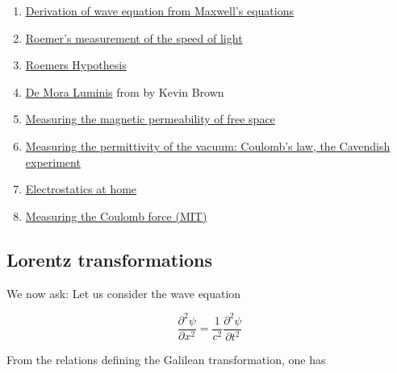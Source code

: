 \begin{enumerate}

\item \href{http://www.santarosa.edu/~lwillia2/42/WaveEquationDerivation.pdf}{Derivation of wave equation from Maxwell's equations}

\item \href{http://www.amnh.org/education/resources/rfl/web/essaybooks/cosmic/p_roemer.html}{Roemer's measurement of the speed of light}

\item \href{http://www.mathpages.com/home/kmath203/kmath203.htm}{Roemers  Hypothesis}

\item \href{http://www.mathpages.com/rr/s3-03/3-03.htm}{De Mora Luminis} from  by Kevin Brown

\item \href{http://physics.wooster.edu/JrIS/Files/Moore_Web_article.pdf}{Measuring the magnetic permeability of free space}

\item \href{http://people.physics.tamu.edu/mcintyre/courses/phys208H/labs/Lab_1.pdf}{Measuring the permittivity of the vacuum: Coulomb's law, the Cavendish experiment }

\item \href{http://mysite.du.edu/~jcalvert/phys/elechome.htm}{Electrostatics at home}

\item  \href{http://ocw.mit.edu/courses/physics/8-02t-electricity-and-magnetism-spring-2005/labs/exp02.pdf}{Measuring the Coulomb force (MIT)}

\end{enumerate}



\subsection{Lorentz transformations}

We now ask:    Let us consider the wave equation

\begin{equation}
\frac{\partial^2 \psi}{\partial x^2}
=
\frac{1}{c^2}
\frac{\partial^2 \psi}{\partial t^2}
\end{equation}

From the relations defining the Galilean transformation,
one has

